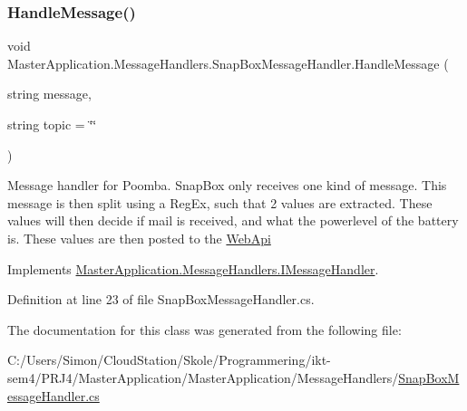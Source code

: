 \subsubsection{\texorpdfstring{Handle\+Message()}{HandleMessage()}}
{\footnotesize\ttfamily void Master\+Application.\+Message\+Handlers.\+Snap\+Box\+Message\+Handler.\+Handle\+Message (\begin{DoxyParamCaption}\item[{string}]{message,  }\item[{string}]{topic = {\ttfamily \char`\"{}\char`\"{}} }\end{DoxyParamCaption})}

Message handler for Poomba. Snap\+Box only receives one kind of message. This message is then split using a Reg\+Ex, such that 2 values are extracted. These values will then decide if mail is received, and what the powerlevel of the battery is. These values are then posted to the \mbox{\hyperlink{namespace_web_api}{Web\+Api}} 

Implements \mbox{\hyperlink{interface_master_application_1_1_message_handlers_1_1_i_message_handler_ada3ca8e0f5f2801663822849a2cfdf40}{Master\+Application.\+Message\+Handlers.\+I\+Message\+Handler}}.



Definition at line 23 of file Snap\+Box\+Message\+Handler.\+cs.



The documentation for this class was generated from the following file\+:\begin{DoxyCompactItemize}
\item 
C\+:/\+Users/\+Simon/\+Cloud\+Station/\+Skole/\+Programmering/ikt-\/sem4/\+P\+R\+J4/\+Master\+Application/\+Master\+Application/\+Message\+Handlers/\mbox{\hyperlink{_snap_box_message_handler_8cs}{Snap\+Box\+Message\+Handler.\+cs}}\end{DoxyCompactItemize}
